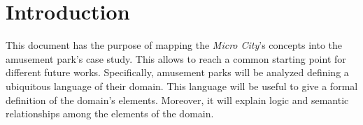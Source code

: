 \section*{Introduction}\label{sec:introduction}

This document has the purpose of mapping the \textit{Micro City}'s concepts into the amusement park's case study.
This allows to reach a common starting point for different future works.
Specifically, amusement parks will be analyzed defining a ubiquitous language of their domain.
This language will be useful to give a formal definition of the domain's elements.
Moreover, it will explain logic and semantic relationships among the elements of the domain.

